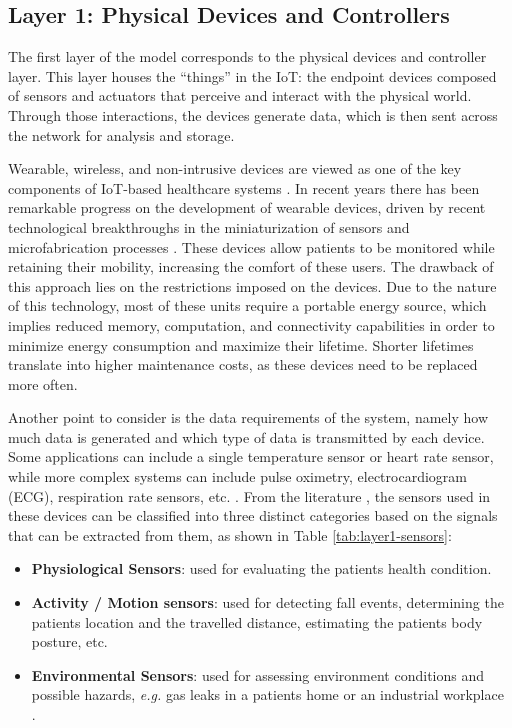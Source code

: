 \subsection{Layer 1: Physical Devices and Controllers}
\label{sec:iot-model-layer1}

The first layer of the model \cite{Cisco2014} corresponds to the physical devices and controller layer. This layer houses the ``things'' in the \acl{IoT}: the endpoint devices composed of sensors and actuators that perceive and interact with the physical world. Through those interactions, the devices generate data, which is then sent across the network for analysis and storage. \bigskip

Wearable, wireless, and non-intrusive devices are viewed as one of the key components of \acs{IoT}-based healthcare systems \cite{Baker2017}. In recent years there has been remarkable progress on the development of wearable devices, driven by recent technological breakthroughs in the miniaturization of sensors and microfabrication processes \cite{Adame2018, Catarinucci2015}. These devices allow patients to be monitored while retaining their mobility, increasing the comfort of these users. The drawback of this approach lies on the restrictions imposed on the devices. Due to the nature of this technology, most of these units require a portable energy source, which implies reduced memory, computation, and connectivity capabilities in order to minimize energy consumption and maximize their lifetime. Shorter lifetimes translate into higher maintenance costs, as these devices need to be replaced more often. \bigskip

Another point to consider is the data requirements of the system, namely how much data is generated and which type of data is transmitted by each device. Some applications can include a single temperature sensor or heart rate sensor, while more complex systems can include pulse oximetry, electrocardiogram (\acs{ECG}), respiration rate sensors, etc. \cite{Wu2020}. From the literature \cite{Wu2020, Wu2019, Adame2018, MinhDang2019}, the sensors used in these devices can be classified into three distinct categories based on the signals that can be extracted from them, as shown in Table \ref{tab:layer1-sensors}:

\begin{itemize}
    \item \textbf{Physiological Sensors}: used for evaluating the patients health condition.
    \item \textbf{Activity / Motion sensors}: used for detecting fall events, determining the patients location and the travelled distance, estimating the patients body posture, etc.
    \item \textbf{Environmental Sensors}: used for assessing environment conditions and possible hazards, \textit{e.g.} gas leaks in a patients home or an industrial workplace \cite{Wu2019}.
\end{itemize}

